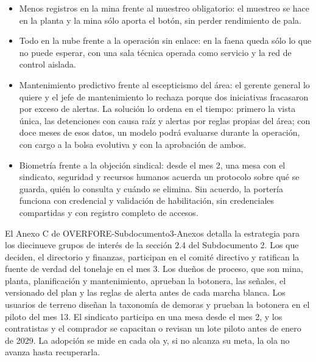 \documentclass[subdoc]{../../comun/overfore}
\begin{document}
\begin{itemize}
\item Menos registros en la mina frente al muestreo obligatorio: el muestreo se hace en la planta y la mina sólo aporta el botón, sin perder rendimiento de pala.
\item Todo en la nube frente a la operación sin enlace: en la faena queda sólo lo que no puede esperar, con una sala técnica operada como servicio y la red de control aislada.
\item Mantenimiento predictivo frente al escepticismo del área: el gerente general lo quiere y el jefe de mantenimiento lo rechaza porque dos iniciativas fracasaron por exceso de alertas. La solución lo ordena en el tiempo: primero la vista única, las detenciones con causa raíz y alertas por reglas propias del área; con doce meses de esos datos, un modelo podrá evaluarse durante la operación, con cargo a la bolsa evolutiva y con la aprobación de ambos.
\item Biometría frente a la objeción sindical: desde el mes 2, una mesa con el sindicato, seguridad y recursos humanos acuerda un protocolo sobre qué se guarda, quién lo consulta y cuándo se elimina. Sin acuerdo, la portería funciona con credencial y validación de habilitación, sin credenciales compartidas y con registro completo de accesos.
\end{itemize}
El Anexo C de OVERFORE-Subdocumento3-Anexos detalla la estrategia para los diecinueve grupos de interés de la sección 2.4 del Subdocumento 2. Los que deciden, el directorio y finanzas, participan en el comité directivo y ratifican la fuente de verdad del tonelaje en el mes 3. Los dueños de proceso, que son mina, planta, planificación y mantenimiento, aprueban la botonera, las señales, el versionado del plan y las reglas de alerta antes de cada marcha blanca. Los usuarios de terreno diseñan la taxonomía de demoras y prueban la botonera en el piloto del mes 13. El sindicato participa en una mesa desde el mes 2, y los contratistas y el comprador se capacitan o revisan un lote piloto antes de enero de 2029. La adopción se mide en cada ola y, si no alcanza su meta, la ola no avanza hasta recuperarla.
\end{document}
